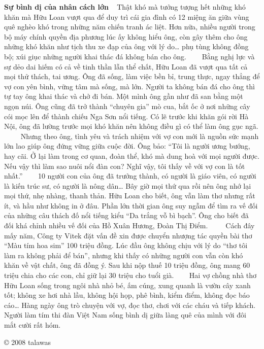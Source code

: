 \documentclass[../main.tex]{subfiles}
\begin{document}
\begin{multicols}{2}
\textbf{Sự bình dị của nhân cách lớn} 
  
Thật khó mà tưởng tượng hết những khó khăn mà Hữu Loan vượt qua để duy trì cái gia đình có 12 miệng ăn giữa vùng quê nghèo khó trong những năm chiến tranh ác liệt. Hơn nữa, nhiều người trong bộ máy chính quyền địa phương lúc ấy không hiểu ông, còn gây thêm cho ông những khó khăn như tịch thu xe đạp của ông với lý do… phụ tùng không đồng bộ; xúi giục những người khai thác đá không bán cho ông. 
\textbf{   } 
Bằng nghị lực và sự dẻo dai hiếm có cả về tinh thần lẫn thể chất, Hữu Loan đã vượt qua tất cả mọi thử thách, tai ương. Ông đã sống, làm việc bền bỉ, trung thực, ngay thẳng để vợ con yên bình, vững tâm mà sống, mà lớn. Người ta không bán đá cho ông thì tự tay ông khai thác và chở đi bán. Một mình ông gần như đã san bằng một ngọn núi. Ông cũng đã trở thành “chuyên gia” mò cua, bắt ốc ở nơi những cây cói mọc lên để thành chiếu Nga Sơn nổi tiếng. Có lẽ trước khi khăn gói rời Hà Nội, ông đã lường trước mọi khó khăn nên không điều gì có thể làm ông gục ngã. 
      
Nhưng theo ông, tình yêu và trách nhiệm với vợ con mới là nguồn sức mạnh lớn lao giúp ông đứng vững giữa cuộc đời. Ông bảo: “Tôi là người ương bướng, hay cãi. Ở lại làm trong cơ quan, đoàn thể, khó mà dung hoà với mọi người được. Nếu vậy thì làm sao nuôi nổi đàn con? Nghĩ vậy, tôi thấy về với vợ con là tốt nhất.” 
     
10 người con của ông đã trưởng thành, có người là giáo viên, có người là kiến trúc sư, có người là nông dân… Bây giờ mọi thứ qua rồi nên ông nhớ lại mọi thứ, nhẹ nhàng, thanh thản. Hữu Loan cho biết, ông vẫn làm thơ nhưng rất ít, và hầu như không in ở đâu. Phần lớn thời gian ông suy ngẫm để tìm ra vế đối của những câu thách đố nổi tiếng kiểu “Da trắng vỗ bì bạch”. Ông cho biết đã đối khá chỉnh nhiều vế đối của Hồ Xuân Hương, Đoàn Thị Điểm.  
     
Cách đây mấy năm, Công ty Vitek đặt vấn đề xin được chuyển nhượng tác quyền bài thơ “Màu tím hoa sim” 100 triệu đồng. Lúc đầu ông không chịu với lý do “thơ tôi làm ra không phải để bán”, nhưng khi thấy có những người con vẫn còn khó khăn về vật chất, ông đã đồng ý. Sau khi nộp thuế 10 triệu đồng, ông mang 60 triệu chia cho các con, chỉ giữ lại 30 triệu cho tuổi già. 
     
Hai vợ chồng nhà thơ Hữu Loan sống trong ngôi nhà nhỏ bé, ấm cúng, xung quanh là vườn cây xanh tốt; không xe hơi nhà lầu, không hội họp, phê bình, kiểm điểm, không đọc báo cáo… Hàng ngày ông trò chuyện với vợ, đọc thơ, chơi với các cháu và tiếp khách. Người làm tím thi đàn Việt Nam sống bình dị giữa làng quê của mình với đôi mắt cười rất hóm. 
 
© 2008 talawas 
\end{multicols}
\end{document}
